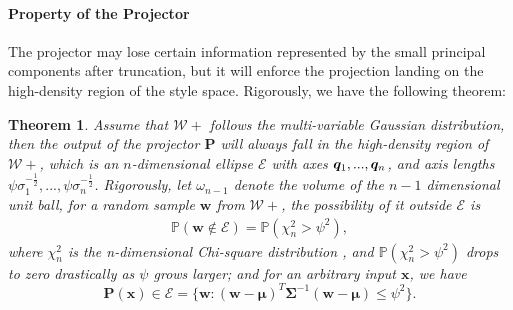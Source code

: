 \documentclass[10pt,twocolumn,letterpaper]{article}
\newcommand{\w}{\bm{w}}
\begin{document}
\paragraph{Property of the Projector} The projector may lose certain information represented by the small principal components after truncation, but it will enforce the projection landing on the high-density region of the style space. Rigorously, we have the following theorem:
\newtheorem{theorem}{Theorem}
\begin{theorem}
Assume that $\mathcal{W}+$ follows the multi-variable Gaussian distribution, then the output of the projector $\bm{P}$ will always fall in the high-density region of $\mathcal{W}+$, which is an $n$-dimensional ellipse $\mathcal{E}$ with axes $\bm{q}_1,...,\bm{q}_n$, and axis lengths $\psi \sigma_1^{-\frac{1}{2}},...,\psi \sigma_n^{-\frac{1}{2}}$. Rigorously, let $\omega_{n-1}$ denote the volume of the $n-1$ dimensional unit ball, for a random sample $\w$ from $\mathcal{W}+$, the possibility of it outside $\mathcal{E}$ is\begin{equation}
\begin{aligned}
    \mathbb{P}(\w \notin \mathcal{E})
    =\mathbb{P}(\chi_n^2>\psi^2),\end{aligned}
\end{equation}
where $\chi_n^2$ is the n-dimensional Chi-square distribution \cite{lancaster2005chi}, and $\mathbb{P}(\chi_n^2>\psi^2)$ drops to zero drastically as $\psi$ grows larger; and for an arbitrary input $\bm{x}$, we have\begin{equation}
    \bm{P}(\bm{x})\in\mathcal{E}=\{\w:(\w-\bm{\mu})^T\bm{\Sigma}^{-1}(\w-\bm{\mu})\leq\psi^2\}.\end{equation}
\end{theorem}
\end{document}
